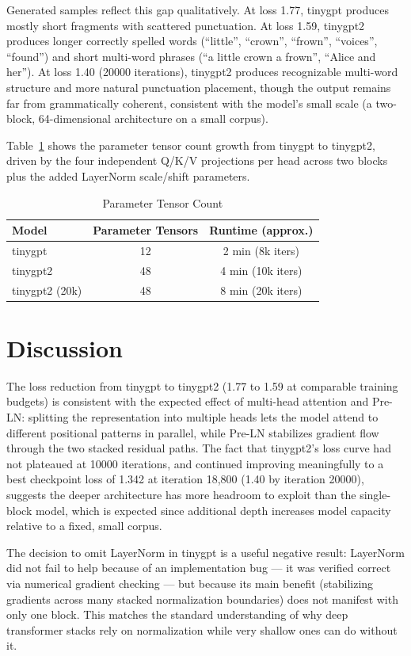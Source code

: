 \documentclass[conference]{IEEEtran}
\begin{document}
Generated samples reflect this gap qualitatively. At loss 1.77, tinygpt produces mostly short fragments with scattered punctuation. At loss 1.59, tinygpt2 produces longer correctly spelled words (``little'', ``crown'', ``frown'', ``voices'', ``found'') and short multi-word phrases (``a little crown a frown'', ``Alice and her''). At loss 1.40 (20000 iterations), tinygpt2 produces recognizable multi-word structure and more natural punctuation placement, though the output remains far from grammatically coherent, consistent with the model's small scale (a two-block, 64-dimensional architecture on a small corpus).

Table~\ref{tab:params} shows the parameter tensor count growth from tinygpt to tinygpt2, driven by the four independent Q/K/V projections per head across two blocks plus the added LayerNorm scale/shift parameters.

\begin{table}[h]
\centering
\caption{Parameter Tensor Count}
\label{tab:params}
\begin{tabular}{lcc}
\toprule
Model & Parameter Tensors & Runtime (approx.) \\
\midrule
tinygpt & 12 & 2 min (8k iters) \\
tinygpt2 & 48 & 4 min (10k iters) \\
tinygpt2 (20k) & 48 & 8 min (20k iters) \\
\bottomrule
\end{tabular}
\end{table}

\section{Discussion}
The loss reduction from tinygpt to tinygpt2 (1.77 to 1.59 at comparable training budgets) is consistent with the expected effect of multi-head attention and Pre-LN: splitting the representation into multiple heads lets the model attend to different positional patterns in parallel, while Pre-LN stabilizes gradient flow through the two stacked residual paths. The fact that tinygpt2's loss curve had not plateaued at 10000 iterations, and continued improving meaningfully to a best checkpoint loss of 1.342 at iteration 18{,}800 (1.40 by iteration 20000), suggests the deeper architecture has more headroom to exploit than the single-block model, which is expected since additional depth increases model capacity relative to a fixed, small corpus.

The decision to omit LayerNorm in tinygpt is a useful negative result: LayerNorm did not fail to help because of an implementation bug — it was verified correct via numerical gradient checking — but because its main benefit (stabilizing gradients across many stacked normalization boundaries) does not manifest with only one block. This matches the standard understanding of why deep transformer stacks rely on normalization while very shallow ones can do without it.
\end{document}
